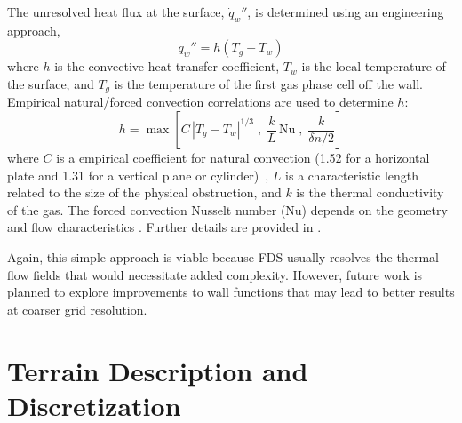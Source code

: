 \documentclass[journal,article,atmosphere,submit,moreauthors,pdftex]{Definitions_Review_Process/mdpi}
\begin{document}
The unresolved heat flux at the surface, $\dot{q}_w''$, is determined using an engineering approach,
\begin{equation}
\dot{q}_w'' = h (T_g - T_w) 
\end{equation}
where $h$ is the convective heat transfer coefficient, $T_w$ is the local temperature of the surface, and $T_g$ is the temperature of the first gas phase cell off the wall.  Empirical natural/forced convection correlations are used to determine $h$:
\begin{equation}
h = \max \left[C\, |T_g-T_w|^{1/3} \; , \;
\frac{k}{L} \, \mathrm{Nu} \; , \;
\frac{k}{\delta n/2} \right]
\label{eq:qconv}
\end{equation}
where $C$ is a empirical coefficient for natural convection (1.52 for a horizontal plate and 1.31 for a vertical plane or cylinder)~\cite{Holman:1}, $L$ is a characteristic length related to the size of the physical obstruction, and $k$ is the thermal conductivity of the gas. The forced convection Nusselt number (Nu) depends on the geometry and flow characteristics \cite{Holman:1,Incropera:1}.  Further details are provided in \cite{FDS_Math_Guide}.

Again, this simple approach is viable because FDS usually resolves the thermal flow fields that would necessitate added complexity.  However, future work is planned to explore improvements to wall functions that may lead to better results at coarser grid resolution.


\section{Terrain Description and Discretization} \label{sec:terraindisc}
\end{document}
